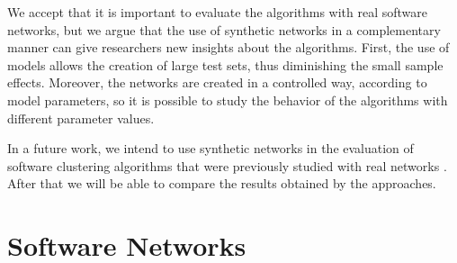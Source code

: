 We accept that it is important to evaluate the algorithms with real software
networks, but we argue that the use of synthetic networks in a complementary
manner can give researchers new insights about the algorithms. First, the use of
models allows the creation of large test sets, thus diminishing the small sample
effects. Moreover, the networks are created in a controlled way, according to
model parameters, so it is possible to study the behavior of the algorithms with
different parameter values.

In a future work, we intend to use synthetic networks in the evaluation of
software clustering algorithms that were previously studied with real networks
\cite{Wu2005}. After that we will be able to compare the results obtained by
the approaches.


\section{Software Networks}

